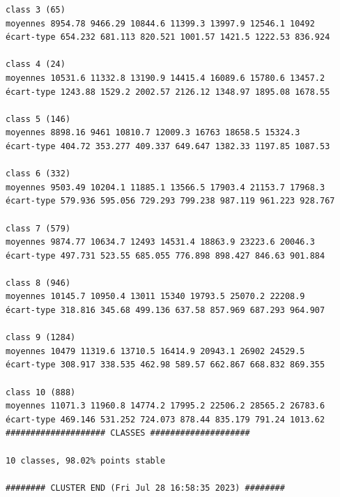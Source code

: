 \documentclass[land,article,submit,pdftex,moreauthors]{Definitions/mdpi}
\begin{document}
\begin{scriptsize}
\begin{verbatim}
class 3 (65)
moyennes 8954.78 9466.29 10844.6 11399.3 13997.9 12546.1 10492
écart-type 654.232 681.113 820.521 1001.57 1421.5 1222.53 836.924

class 4 (24)
moyennes 10531.6 11332.8 13190.9 14415.4 16089.6 15780.6 13457.2
écart-type 1243.88 1529.2 2002.57 2126.12 1348.97 1895.08 1678.55

class 5 (146)
moyennes 8898.16 9461 10810.7 12009.3 16763 18658.5 15324.3
écart-type 404.72 353.277 409.337 649.647 1382.33 1197.85 1087.53

class 6 (332)
moyennes 9503.49 10204.1 11885.1 13566.5 17903.4 21153.7 17968.3
écart-type 579.936 595.056 729.293 799.238 987.119 961.223 928.767

class 7 (579)
moyennes 9874.77 10634.7 12493 14531.4 18863.9 23223.6 20046.3
écart-type 497.731 523.55 685.055 776.898 898.427 846.63 901.884

class 8 (946)
moyennes 10145.7 10950.4 13011 15340 19793.5 25070.2 22208.9
écart-type 318.816 345.68 499.136 637.58 857.969 687.293 964.907

class 9 (1284)
moyennes 10479 11319.6 13710.5 16414.9 20943.1 26902 24529.5
écart-type 308.917 338.535 462.98 589.57 662.867 668.832 869.355

class 10 (888)
moyennes 11071.3 11960.8 14774.2 17995.2 22506.2 28565.2 26783.6
écart-type 469.146 531.252 724.073 878.44 835.179 791.24 1013.62
#################### CLASSES ####################

10 classes, 98.02% points stable

######## CLUSTER END (Fri Jul 28 16:58:35 2023) ########

\end{verbatim}
\end{scriptsize}
\end{document}
